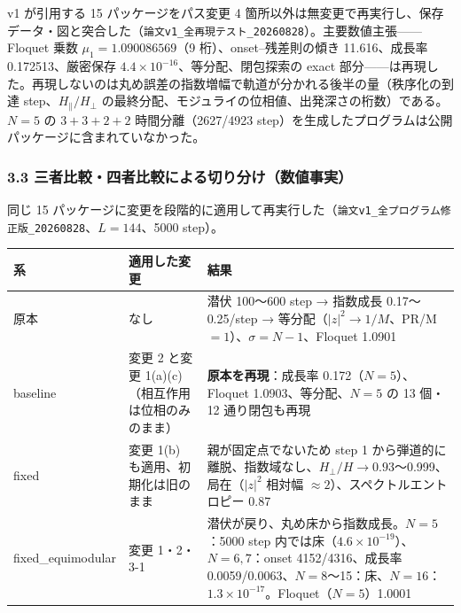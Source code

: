 \documentclass[
  10pt,
  a4paper,
]{ltjsarticle}
\newcounter{none} %
\begin{document}
v1 が引用する 15 パッケージをパス変更 4
箇所以外は無変更で再実行し、保存データ・図と突合した（\texttt{論文v1\_全再現テスト\_20260828}）。主要数値主張------Floquet
乗数 \(\mu_1=1.090086569\)（9 桁）、onset--残差則の傾き 11.616、成長率
0.172513、厳密保存 \(4.4\times10^{-16}\)、等分配、閉包探索の exact
部分------は再現した。再現しないのは丸め誤差の指数増幅で軌道が分かれる後半の量（秩序化の到達
step、\(H_\parallel/H_\perp\)
の最終分配、モジュライの位相値、出発深さの桁数）である。\(N=5\) の
\(3+3+2+2\) 時間分離（2627/4923
step）を生成したプログラムは公開パッケージに含まれていなかった。

\subsubsection{3.3
三者比較・四者比較による切り分け（数値事実）}\label{ux4e09ux8005ux6bd4ux8f03ux56dbux8005ux6bd4ux8f03ux306bux3088ux308bux5207ux308aux5206ux3051ux6570ux5024ux4e8bux5b9f}

同じ 15
パッケージに変更を段階的に適用して再実行した（\texttt{論文v1\_全プログラム修正版\_20260828}、\(L=144\)、5000
step）。

{\def\LTcaptype{none} %
\begin{longtable}[]{@{}
  >{\raggedright\arraybackslash}p{}
  >{\raggedright\arraybackslash}p{}
  >{\raggedright\arraybackslash}p{}@{}}
\toprule\noalign{}
\begin{minipage}[b]{\linewidth}\raggedright
系
\end{minipage} & \begin{minipage}[b]{\linewidth}\raggedright
適用した変更
\end{minipage} & \begin{minipage}[b]{\linewidth}\raggedright
結果
\end{minipage} \\
\midrule\noalign{}
\endhead
\bottomrule\noalign{}
\endlastfoot
原本 & なし & 潜伏 100〜600 step → 指数成長 0.17〜0.25/step →
等分配（\(|z|^2\to1/M\)、PR/M \(=1\)）、\(\sigma=N-1\)、Floquet
1.0901 \\
baseline & 変更 2 と変更 1(a)(c)（相互作用は位相のみのまま） &
\textbf{原本を再現}：成長率 0.172（\(N=5\)）、Floquet
1.0903、等分配、\(N=5\) の 13 個・12 通り閉包も再現 \\
fixed & 変更 1(b) も適用、初期化は旧のまま & 親が固定点でないため step 1
から弾道的に離脱、指数域なし、\(H_\perp/H\to0.93\)〜0.999、局在（\(|z|^2\)
相対幅 \(\approx2\)）、スペクトルエントロピー 0.87 \\
fixed\_equimodular & 変更 1・2・3-1 &
潜伏が戻り、丸め床から指数成長。\(N=5\)：5000 step
内では床（\(4.6\times10^{-19}\)）、\(N=6,7\)：onset 4152/4316、成長率
0.0059/0.0063、\(N=8\)〜15：床、\(N=16\)：\(1.3\times10^{-17}\)。Floquet（\(N=5\)）1.0001 \\
\end{longtable}
}
\end{document}
